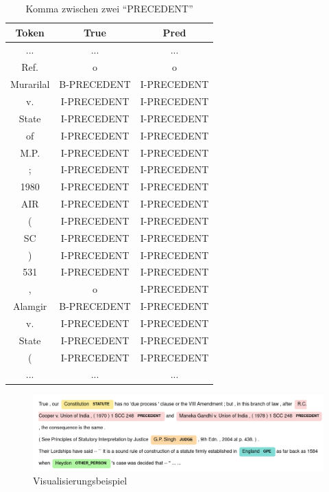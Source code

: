 \documentclass[paper=A4, ngerman, fontsize=12pt]{article}
\begin{document}
	\begin{table}
		\begin{center}
			\begin{tabular}{@{}| c | c c | @{}}
				\toprule
				Token & True& Pred   \\ \midrule
				\hline
				... & ... & ... \\ \midrule
				Ref. & o & o \\ \midrule
				Murarilal & B-PRECEDENT & I-PRECEDENT \\   \midrule
				v. & I-PRECEDENT & I-PRECEDENT \\   \midrule
				State & I-PRECEDENT & I-PRECEDENT  \\  \midrule
				of &  I-PRECEDENT & I-PRECEDENT \\ \midrule
				M.P. &  I-PRECEDENT& I-PRECEDENT \\   \midrule
				; & I-PRECEDENT & I-PRECEDENT \\  \midrule
				1980 & I-PRECEDENT & I-PRECEDENT \\  \midrule
				AIR & I-PRECEDENT & I-PRECEDENT \\  \midrule
				(  & I-PRECEDENT & I-PRECEDENT \\  \midrule
				SC & I-PRECEDENT & I-PRECEDENT \\  \midrule
				)  & I-PRECEDENT & I-PRECEDENT \\  \midrule
				531 & I-PRECEDENT & I-PRECEDENT \\  \midrule
				, & o & I-PRECEDENT \\  \midrule
				Alamgir & B-PRECEDENT & I-PRECEDENT \\  \midrule
				v. & I-PRECEDENT & I-PRECEDENT \\  \midrule
				State & I-PRECEDENT & I-PRECEDENT \\  \midrule
				(  & I-PRECEDENT & I-PRECEDENT \\  \midrule
				... & ... & ... \\  \bottomrule
			\end{tabular}
			\caption{ Komma zwischen zwei \enquote{PRECEDENT} }
		\end{center}
	\end{table}	

	\begin{figure}
		\begin{center}
			\includegraphics[width=15cm]{Illustrations/visualization.png}
			\caption{Visualisierungsbeispiel}
			\label{Visualisierungsbeispiel}
		\end{center}
	\end{figure}
	
\end{document}
